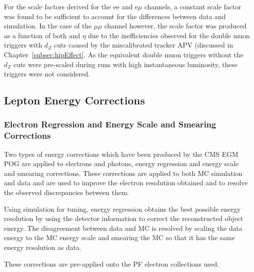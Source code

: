 
For the scale factors derived for the ee and e$\mu$ channels, a constant scale factor was found to be sufficient to account for the differences between data and simulation.
In the case of the $\mu\mu$ channel however, the scale factor was produced as a function of both \pt and $\eta$ due to the inefficiencies observed for the double muon triggers with $d_{Z}$ cuts caused by the miscalibrated tracker APV (discussed in Chapter~\ref{subsec:hipEffect}.
As the equivalent double muon triggers without the $d_{Z}$ cuts were pre-scaled during runs with high instantaneous luminosity, these triggers were not considered.

\subsection{Lepton Energy Corrections}\label{subsec:leptonEnergyCorrections}
\subsubsection{Electron Regression and Energy Scale and Smearing Corrections}
Two types of energy corrections which have been produced by the CMS EGM POG are applied to electrons and photons, energy regression and energy scale and smearing corrections.
These corrections are applied to both MC simulation and data and are used to improve the electron resolution obtained and to resolve the observed discrepancies between them.

Using simulation for tuning, energy regression obtains the best possible energy resolution by using the detector information to correct the reconstructed object energy.
The disagreement between data and MC is resolved by scaling the data energy to the MC energy scale and smearing the MC so that it has the same energy resolution as data. 

These corrections are pre-applied onto the PF electron collections used.

